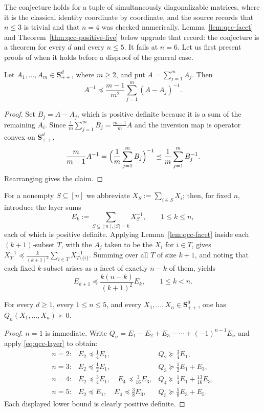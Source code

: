 \begin{cxrefutation}
The conjecture holds for a tuple of simultaneously diagonalizable matrices, where it is the classical identity coordinate by coordinate, and the source records that $n\le3$ is trivial and that $n=4$ was checked numerically.  Lemma~\ref{lem:qcc-facet} and Theorem~\ref{thm:qcc-positive-five} below upgrade that record: the conjecture is a theorem for every $d$ and every $n\le5$.  It fails at $n=6$. Let us first present proofs of when it holds before a disproof of the general case.

\begin{lemma}\label{lem:qcc-facet}
Let $A_1,\ldots,A_m\in\mathbf{S}_{++}^{d}$, where $m\ge2$, and put $A=\sum_{j=1}^{m}A_j$.  Then
\[
A^{-1}\preceq\frac{m-1}{m^2}\sum_{j=1}^{m}(A-A_j)^{-1}.
\]
\end{lemma}
\begin{proof}
Set $B_j=A-A_j$, which is positive definite because it is a sum of the remaining $A_i$.  Since $\frac1m\sum_{j=1}^{m}B_j=\frac{m-1}{m}A$ and the inversion map is operator convex on $\mathbf{S}_{++}^{d}$,
\[
\frac{m}{m-1}A^{-1}
=\Bigl(\frac1m\sum_{j=1}^{m}B_j\Bigr)^{-1}
\preceq\frac1m\sum_{j=1}^{m}B_j^{-1}.
\]
Rearranging gives the claim.
\end{proof}

For a nonempty $S\subseteq[n]$ we abbreviate $X_S:=\sum_{i\in S}X_i$; then, for fixed $n$, introduce the layer sums
\[
E_k:=\sum_{S\subseteq[n], |S|=k} X_S^{-1},\qquad1\le k\le n,
\]
each of which is positive definite.  Applying Lemma~\ref{lem:qcc-facet} inside each $(k+1)$-subset $T$, with the $A_j$ taken to be the $X_i$ for $i\in T$, gives $X_T^{-1}\preceq\frac{k}{(k+1)^2}\sum_{i\in T}X_{T\setminus\{i\}}^{-1}$.  Summing over all $T$ of size $k+1$, and noting that each fixed $k$-subset arises as a facet of exactly $n-k$ of them, yields
\begin{equation}\label{eq:qcc-layer}
E_{k+1}\preceq\frac{k(n-k)}{(k+1)^2}E_k,\qquad1\le k<n.
\end{equation}

\begin{theorem}\label{thm:qcc-positive-five}
For every $d\ge1$, every $1\le n\le5$, and every $X_1,\ldots,X_n\in\mathbf{S}_{++}^{d}$, one has $Q_n(X_1,\ldots,X_n)\succ0$.
\end{theorem}
\begin{proof}
$n=1$ is immediate.  Write $Q_n=E_1-E_2+E_3-\cdots+(-1)^{n-1}E_n$ and apply \eqref{eq:qcc-layer} to obtain:
\[
\begin{array}{rcl}
n=2:&E_2\preceq\frac14E_1,&Q_2\succeq\frac34E_1,\\[0.35em]
n=3:&E_2\preceq\frac12E_1,&Q_3\succeq\frac12E_1+E_3,\\[0.35em]
n=4:&E_2\preceq\frac34E_1,\quad E_4\preceq\frac3{16}E_3,
&Q_4\succeq\frac14E_1+\frac{13}{16}E_3,\\[0.35em]
n=5:&E_2\preceq E_1,\quad E_4\preceq\frac38E_3,
&Q_5\succeq\frac58E_3+E_5.
\end{array}
\]
Each displayed lower bound is clearly positive definite.
\end{proof}


\end{cxrefutation}
